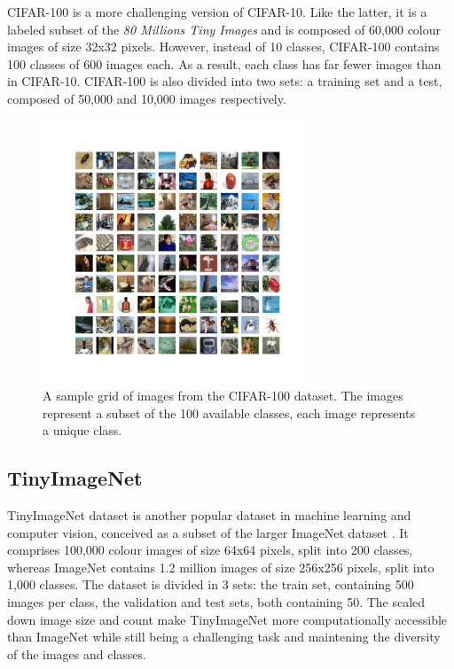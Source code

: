 CIFAR-100 \cite{CIFARdataset} is a more challenging
version of CIFAR-10. Like the latter, it is a labeled subset of the \emph{80
  Millions Tiny Images} and  is composed of 60,000 colour images of size 32x32
pixels. However, instead of 10 classes, CIFAR-100 contains 100 classes of 600
images each. As a result, each class has far fewer images than in CIFAR-10.
CIFAR-100 is also divided into two sets: a training set and a test, composed of
50,000 and 10,000 images respectively.\\

\begin{figure}[ht!]
  \centering
  \includegraphics[width=0.7\textwidth]{chapter_dlo/assets/cifar-100_example.png}
  \caption{A sample grid of images from the CIFAR-100 dataset. The images
    represent a subset of the 100 available classes, each image represents
    a unique class.}
  \label{fig:intro:cifar100_examples}
\end{figure}


\subsection{TinyImageNet}

TinyImageNet dataset is another popular dataset
in machine learning and computer vision, conceived as a subset of the larger
ImageNet dataset \cite{DBLP:journals/ijcv/RussakovskyDSKS15}. It comprises
100,000 colour images of size 64x64 pixels, split into 200 classes, whereas
ImageNet contains 1.2 million images of size 256x256 pixels, split into 1,000
classes. The dataset is divided in 3 sets: the train set, containing 500
images per class, the validation and test sets, both containing 50. The scaled
down image size and count make TinyImageNet more computationally accessible than
ImageNet while still being a challenging task and maintening the diversity of
the images and classes.\\


